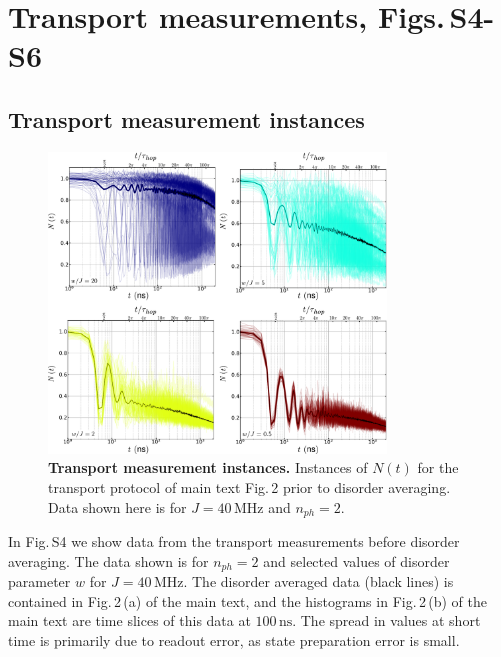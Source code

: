 \section{Transport measurements, Figs.\,S4-S6}
\subsection{Transport measurement instances}
\begin{figure}[h!]
    \centering
    \includegraphics[width=0.8\textwidth, keepaspectratio]{./PDF/fs4_190625_150p.pdf}
    \caption{\textbf{Transport measurement instances.}
    Instances of $N \left( t \right)$ for the transport protocol of main text Fig.\,2 prior to disorder averaging.  Data shown here is for $J=40 \, \text{MHz}$ and $n_{ph}=2$.
    }
    \end{figure}

In Fig.\,S4 we show data from the transport measurements before disorder averaging.  The data shown is for $n_{ph}=2$ and selected values of disorder parameter $w$ for $J = 40 \, \text{MHz}$.
The disorder averaged data (black lines) is contained in Fig.\,2\,(a) of the main text, and the histograms in Fig.\,2\,(b) of the main text are time slices of this data at $100 \, \text{ns}$.
The spread in values at short time is primarily due to readout error, as state preparation error is small.

